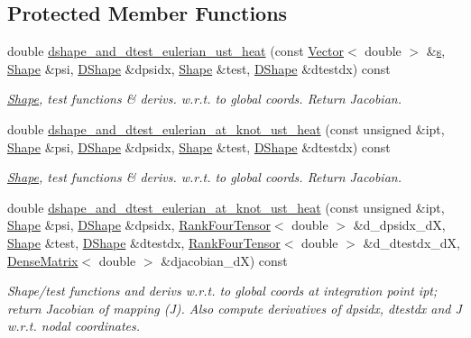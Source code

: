 \subsection*{Protected Member Functions}
\begin{DoxyCompactItemize}
\item 
double \hyperlink{classoomph_1_1TUnsteadyHeatElement_ab957ee8223e82d47e75eafde43c1a3e3}{dshape\+\_\+and\+\_\+dtest\+\_\+eulerian\+\_\+ust\+\_\+heat} (const \hyperlink{classoomph_1_1Vector}{Vector}$<$ double $>$ \&\hyperlink{cfortran_8h_ab7123126e4885ef647dd9c6e3807a21c}{s}, \hyperlink{classoomph_1_1Shape}{Shape} \&psi, \hyperlink{classoomph_1_1DShape}{D\+Shape} \&dpsidx, \hyperlink{classoomph_1_1Shape}{Shape} \&test, \hyperlink{classoomph_1_1DShape}{D\+Shape} \&dtestdx) const
\begin{DoxyCompactList}\small\item\em \hyperlink{classoomph_1_1Shape}{Shape}, test functions \& derivs. w.\+r.\+t. to global coords. Return Jacobian. \end{DoxyCompactList}\item 
double \hyperlink{classoomph_1_1TUnsteadyHeatElement_a0e7b03ebbf897295a34bae8d0dfe9686}{dshape\+\_\+and\+\_\+dtest\+\_\+eulerian\+\_\+at\+\_\+knot\+\_\+ust\+\_\+heat} (const unsigned \&ipt, \hyperlink{classoomph_1_1Shape}{Shape} \&psi, \hyperlink{classoomph_1_1DShape}{D\+Shape} \&dpsidx, \hyperlink{classoomph_1_1Shape}{Shape} \&test, \hyperlink{classoomph_1_1DShape}{D\+Shape} \&dtestdx) const
\begin{DoxyCompactList}\small\item\em \hyperlink{classoomph_1_1Shape}{Shape}, test functions \& derivs. w.\+r.\+t. to global coords. Return Jacobian. \end{DoxyCompactList}\item 
double \hyperlink{classoomph_1_1TUnsteadyHeatElement_a45a721e6148650c201f6aed6a5f38702}{dshape\+\_\+and\+\_\+dtest\+\_\+eulerian\+\_\+at\+\_\+knot\+\_\+ust\+\_\+heat} (const unsigned \&ipt, \hyperlink{classoomph_1_1Shape}{Shape} \&psi, \hyperlink{classoomph_1_1DShape}{D\+Shape} \&dpsidx, \hyperlink{classoomph_1_1RankFourTensor}{Rank\+Four\+Tensor}$<$ double $>$ \&d\+\_\+dpsidx\+\_\+dX, \hyperlink{classoomph_1_1Shape}{Shape} \&test, \hyperlink{classoomph_1_1DShape}{D\+Shape} \&dtestdx, \hyperlink{classoomph_1_1RankFourTensor}{Rank\+Four\+Tensor}$<$ double $>$ \&d\+\_\+dtestdx\+\_\+dX, \hyperlink{classoomph_1_1DenseMatrix}{Dense\+Matrix}$<$ double $>$ \&djacobian\+\_\+dX) const
\begin{DoxyCompactList}\small\item\em Shape/test functions and derivs w.\+r.\+t. to global coords at integration point ipt; return Jacobian of mapping (J). Also compute derivatives of dpsidx, dtestdx and J w.\+r.\+t. nodal coordinates. \end{DoxyCompactList}\item 

\end{DoxyCompactItemize}
